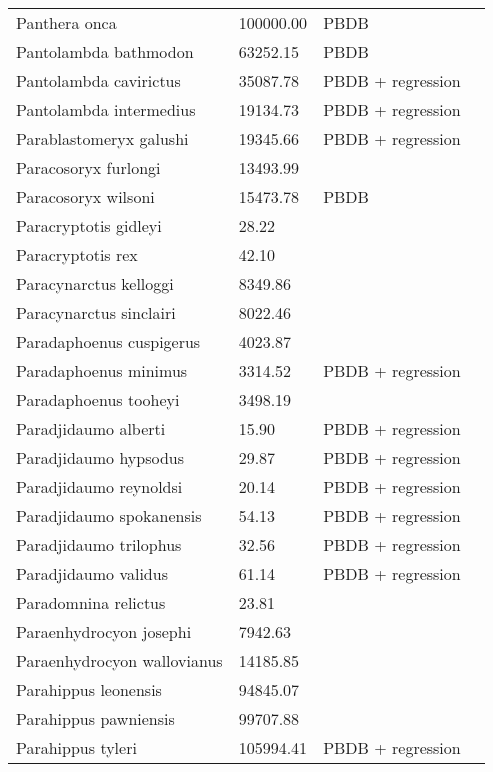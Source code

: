 \documentclass{article}
\begin{document}
\begin{center}
\begin{longtable}{p{} p{} p{} p{}}
    Panthera onca & 100000.00 & PBDB &  \\ 
    Pantolambda bathmodon & 63252.15 & PBDB &  \\ 
    Pantolambda cavirictus & 35087.78 & PBDB + regression &  \\ 
    Pantolambda intermedius & 19134.73 & PBDB + regression &  \\ 
    Parablastomeryx galushi & 19345.66 & PBDB + regression &  \\ 
    Paracosoryx furlongi & 13493.99 & \cite{Tomiya2013} &  \\ 
    Paracosoryx wilsoni & 15473.78 & PBDB &  \\ 
    Paracryptotis gidleyi & 28.22 & \cite{Tomiya2013} &  \\ 
    Paracryptotis rex & 42.10 & \cite{Tomiya2013} &  \\ 
    Paracynarctus kelloggi & 8349.86 & \cite{Tomiya2013} &  \\ 
    Paracynarctus sinclairi & 8022.46 & \cite{Tomiya2013} &  \\ 
    Paradaphoenus cuspigerus & 4023.87 & \cite{Tomiya2013} &  \\ 
    Paradaphoenus minimus & 3314.52 & PBDB + regression &  \\ 
    Paradaphoenus tooheyi & 3498.19 & \cite{Tomiya2013} &  \\ 
    Paradjidaumo alberti & 15.90 & PBDB + regression &  \\ 
    Paradjidaumo hypsodus & 29.87 & PBDB + regression &  \\ 
    Paradjidaumo reynoldsi & 20.14 & PBDB + regression &  \\ 
    Paradjidaumo spokanensis & 54.13 & PBDB + regression &  \\ 
    Paradjidaumo trilophus & 32.56 & PBDB + regression &  \\ 
    Paradjidaumo validus & 61.14 & PBDB + regression &  \\ 
    Paradomnina relictus & 23.81 & \cite{Tomiya2013} &  \\ 
    Paraenhydrocyon josephi & 7942.63 & \cite{Tomiya2013} &  \\ 
    Paraenhydrocyon wallovianus & 14185.85 & \cite{Tomiya2013} &  \\ 
    Parahippus leonensis & 94845.07 & \cite{Tomiya2013} &  \\ 
    Parahippus pawniensis & 99707.88 & \cite{Tomiya2013} &  \\ 
    Parahippus tyleri & 105994.41 & PBDB + regression &  \\ 

\end{longtable}
\end{center}
\end{document}
